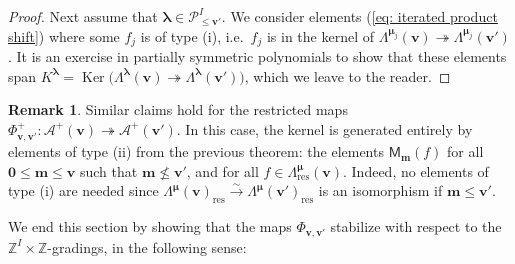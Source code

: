 \documentclass[11pt,reqno]{amsart}
\renewcommand{\mathbf}{\mathbold}
\numberwithin{equation}{section}
\theoremstyle{definition}
\newtheorem{Remark}[equation]{Remark}
\newcommand{\cA}{\mathcal{A}}
\newcommand{\cP}{\mathcal{P}}
\newcommand{\bm}{\mathbf{m}}
\newcommand{\bv}{\mathbf{v}}
\newcommand{\ZZ}{\mathbb{Z}}
\renewcommand{\bv}{\mathbf{v}} %
\newcommand{\M}{\mathsf{M}}
\newcommand{\vertexset}{I}
\newcommand{\GT}{\Lambda}
\newcommand{\Partitions}{\cP}
\newcommand{\bla}{{\boldsymbol{\lambda}}}
\newcommand{\bmu}{{\boldsymbol{\mu}}}
\newcommand{\qzastplus}{\cA^{+}}
\newcommand{\res}{\mathrm{res}}
\begin{document}
\begin{proof}
Next assume that $\bla \in \Partitions_{\leq \bv'}^\vertexset$.  We consider elements (\ref{eq: iterated product shift}) where some $f_j$ is of type (i), i.e.~$f_j$ is in the kernel of $\GT^{\bmu_j}(\bv) \twoheadrightarrow \GT^{\bmu_j}(\bv')$.  It is an exercise in partially symmetric polynomials to show that these elements span $K^\bla = \operatorname{Ker}\big( \GT^{\bla}(\bv) \twoheadrightarrow \GT^{\bla}(\bv')\big)$, which we leave to the reader. 
\end{proof}

\begin{Remark}
    Similar claims hold for the restricted maps $\Phi_{\bv,\bv'}^+ : \qzastplus(\bv) \twoheadrightarrow \qzastplus(\bv')$. In this case, the kernel is generated entirely by elements of type (ii) from the previous theorem: the elements $\M_\bm(f)$ for all $\mathbf 0 \leq \bm \leq \bv$ such that $\bm \not\leq \bv'$, and for all $f \in \GT_{\res}^\bmu(\bv)$.  Indeed, no elements of type (i) are needed since $\GT^\bmu(\bv)_\res \stackrel{\sim}{\rightarrow} \GT^\bmu(\bv')_\res$ is an isomorphism if $\bm \leq \bv'$.
\end{Remark}

We end this section by showing that the maps $\Phi_{\bv,\bv'}$ stabilize with respect to the $\ZZ^\vertexset\times \ZZ$-gradings, in the following sense:
\end{document}
